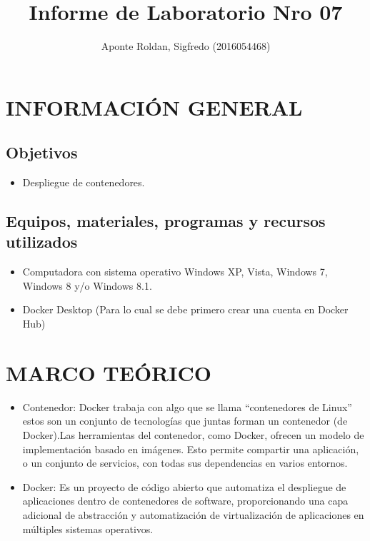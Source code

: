 \documentclass[preprint,12pt]{elsarticle}
\begin{document}
	\begin{frontmatter}
		\title{\huge Informe de Laboratorio Nro 07}
		\address{Universidad Privada de Tacna}
		\address{Escuela Profesional de Ingeniería de Sistemas}
		\address{Curso : Base de Datos II}		
		\author{Aponte Roldan, Sigfredo        (2016054468)}		
		\address{Tacna, Perú}
	\end{frontmatter}

\section{INFORMACIÓN GENERAL} 

\subsection {\textbf{Objetivos}}
\begin{itemize}
	\item Despliegue de contenedores.
\end{itemize}

\subsection {\textbf{Equipos, materiales, programas y recursos utilizados}}
\begin{itemize}
	\item Computadora con sistema operativo Windows XP, Vista, Windows 7, Windows 8 y/o Windows 8.1.
	\item Docker Desktop (Para lo cual se debe primero crear una cuenta en Docker Hub)
\end{itemize}

\section{MARCO TEÓRICO}
\begin{itemize}
\item Contenedor: Docker trabaja con algo que se llama “contenedores de Linux” estos son un conjunto de tecnologías que juntas forman un contenedor (de Docker).Las herramientas del contenedor, como Docker, ofrecen un modelo de implementación basado en imágenes. Esto permite compartir una aplicación, o un conjunto de servicios, con todas sus dependencias en varios entornos.
\item Docker: Es un proyecto de código abierto que automatiza el despliegue de aplicaciones dentro de contenedores de software, proporcionando una capa adicional de abstracción y automatización de virtualización de aplicaciones en múltiples sistemas operativos.
\end{itemize}
\end{document}
